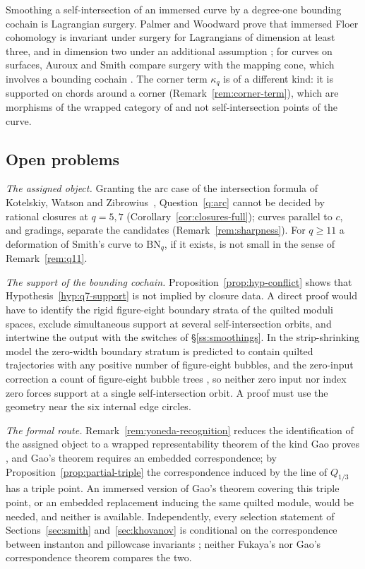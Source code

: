 Smoothing a self-intersection of an immersed curve by a degree-one bounding cochain is Lagrangian
surgery.  Palmer and Woodward prove that immersed Floer cohomology is invariant under surgery for
Lagrangians of dimension at least three, and in dimension two under an additional assumption
\cite[Thm.~1.3]{PalmerWoodward}; for curves on surfaces, Auroux and Smith compare surgery with the
mapping cone, which involves a bounding cochain \cite[Lem.~2.25 and Rem.~2.26]{AurouxSmith}.  The
corner term $\kappa_q$ is of a different kind: it is supported on chords around a corner
(Remark~\ref{rem:corner-term}), which are morphisms of the wrapped category of
\cite[\S11.5]{CHKK} and not self-intersection points of the curve.

\subsection{Open problems}\label{ss:disc-open}
\emph{The assigned object.}  Granting the arc case of the intersection formula of Kotelskiy, Watson and
Zibrowius~\cite[Thm.~5.25]{KWZ}, Question~\ref{q:arc} cannot be decided by rational closures at $q=5,7$
(Corollary~\ref{cor:closures-full}); curves parallel to $c$, and gradings, separate the
candidates (Remark~\ref{rem:sharpness}).  For $q\ge11$ a deformation of Smith's curve to
$\mathrm{BN}_q$, if it exists, is not small in the sense of Remark~\ref{rem:q11}.

\emph{The support of the bounding cochain.}  Proposition~\ref{prop:hyp-conflict} shows that
Hypothesis~\ref{hyp:q7-support} is not implied by closure data.  A direct proof would have to identify
the rigid figure-eight boundary strata of the quilted moduli spaces, exclude simultaneous support at
several self-intersection orbits, and intertwine the output with the switches of
\S\ref{ss:smoothings}.  In the strip-shrinking model the zero-width boundary stratum is predicted to
contain quilted trajectories with any positive number of figure-eight bubbles, and the zero-input
correction a count of figure-eight bubble trees \cite[\S\S4.2--4.4]{BottmanWehrheim}, so neither zero
input nor index zero forces support at a single self-intersection orbit.  A proof must use the geometry near the six internal
edge circles.

\emph{The formal route.}  Remark~\ref{rem:yoneda-recognition} reduces the identification of the
assigned object to a wrapped representability theorem of the kind Gao proves
\cite[Thm.~7.24 and Cor.~7.25]{Gao}, and Gao's theorem requires an embedded correspondence; by Proposition~\ref{prop:partial-triple} the correspondence
induced by the line of $Q_{1/3}$ has a triple point.  An immersed version of Gao's theorem covering
this triple point, or an embedded replacement inducing the same quilted module, would be needed, and
neither is available.  Independently, every selection statement of Sections~\ref{sec:smith}
and~\ref{sec:khovanov} is conditional on the correspondence between instanton and pillowcase
invariants \cite[Conj.~D]{CHKK}; neither Fukaya's nor Gao's correspondence theorem
\cite{FukayaCorr,Gao} compares the two.

